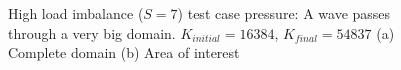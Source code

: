 \begin{figure}[H]
    \centering
    \hfill
    \caption{High load imbalance (\(S = 7\)) test case pressure: A wave passes through a very big domain. \(K_{initial} = 16384\), \(K_{final} = 54837\) (a) Complete domain (b) Area of interest}\label{fig:load_imbalance_case_high_p}
\end{figure}

